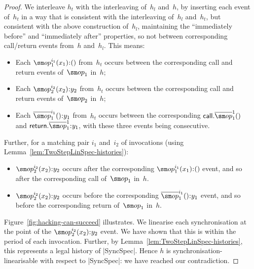 \begin{proof}
We interleave $h_t$ with the interleaving of~$h_l$ and~$h$, by inserting each
event of~$h_t$ in a way that is consistent with the interleaving of~$h_l$
and~$h_t$, but consistent with the above construction of~$h_l$, maintaining
the ``immediately before'' and ``immediately after'' properties, so not
between corresponding call/return events from~$h$ and~$h_l$.  This means:
%
\begin{itemize}
\item Each $\op_1^{i_1}(x_1)\::()$ from~$h_t$ occurs between the corresponding
  call and return events of~$\op_1$ in~$h$;

\item Each $\op_2^{i_2}(x_2)\::y_2$ from~$h_t$ occurs between the
  corresponding call and return events of~$\op_2$ in~$h$;

\item Each $\overline{\op}_1^{i_1}()\::y_1$ from~$h_t$  occurs
  between the corresponding $\call.\overline{\op}_1^1()$ and
  $\return.\overline{\op}_1^1\::y_1$, with these three events being
  consecutive.
\end{itemize}
%
Further, for a matching pair $i_1$ and~$i_2$ of invocations (using
Lemma~\ref{lem:TwoStepLinSpec-histories}):
%
\begin{itemize}
\item $\op_2^{i_2}(x_2)\::y_2$ occurs after the corresponding
  $\op_1^{i_1}(x_1)\::()$ event, and so after the corresponding call
  of~$\op_1$ in~$h$.

\item $\op_2^{i_2}(x_2)\::y_2$ occurs before the corresponding
  $\overline\op_1^{i_1}()\::y_1$ event, and so before the corresponding return
  of~$\op_1$ in~$h$.
\end{itemize}
%
Figure~\ref{fig:hacking-can-succeed} illustrates.  We linearise each
synchronisation at the point of the $\op_2^{i_2}(x_2)\::y_2$ event.  We have
shown that this is within the period of each invocation.  Further, by
Lemma~\ref{lem:TwoStepLinSpec-histories}, this represents a legal history of
|SyncSpec|.  Hence $h$ is synchronisation-linearisable with respect to
|SyncSpec|: we have reached our contradiction.
\end{proof}



